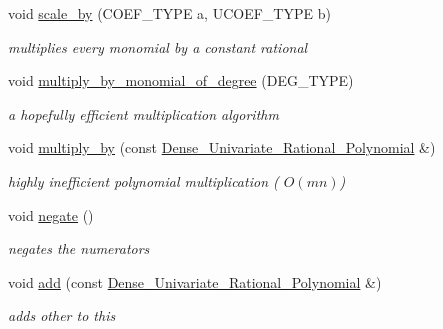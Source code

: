 \begin{Indent}
\begin{DoxyCompactItemize}
void \hyperlink{group__polygroup_a75113519785d8fba7d957b630bd26a54}{scale\+\_\+by} (C\+O\+E\+F\+\_\+\+T\+Y\+PE a, U\+C\+O\+E\+F\+\_\+\+T\+Y\+PE b)
\begin{DoxyCompactList}\small\item\em multiplies every monomial by a constant rational \end{DoxyCompactList}\item 
void \hyperlink{group__polygroup_ab21b7f1a23165a93293db98129fdd48c}{multiply\+\_\+by\+\_\+monomial\+\_\+of\+\_\+degree} (D\+E\+G\+\_\+\+T\+Y\+PE)
\begin{DoxyCompactList}\small\item\em a hopefully efficient multiplication algorithm \end{DoxyCompactList}\item 
\mbox{\label{group__polygroup_af73d51542118ec7fbe36757b2590220e}} 
void \hyperlink{group__polygroup_af73d51542118ec7fbe36757b2590220e}{multiply\+\_\+by} (const \hyperlink{group__polygroup_class_dense___univariate___rational___polynomial}{Dense\+\_\+\+Univariate\+\_\+\+Rational\+\_\+\+Polynomial} \&)
\begin{DoxyCompactList}\small\item\em highly inefficient polynomial multiplication ( $O(mn)$) \end{DoxyCompactList}\item 
\mbox{\label{group__polygroup_a4086e22f45503e348985f120b3c0a79c}} 
void \hyperlink{group__polygroup_a4086e22f45503e348985f120b3c0a79c}{negate} ()
\begin{DoxyCompactList}\small\item\em negates the numerators \end{DoxyCompactList}\item 
\mbox{\label{group__polygroup_a8cf0a014475645d777b7f3168d632a93}} 
void \hyperlink{group__polygroup_a8cf0a014475645d777b7f3168d632a93}{add} (const \hyperlink{group__polygroup_class_dense___univariate___rational___polynomial}{Dense\+\_\+\+Univariate\+\_\+\+Rational\+\_\+\+Polynomial} \&)
\begin{DoxyCompactList}\small\item\em adds {\ttfamily other} to {\ttfamily this} \end{DoxyCompactList}\item 
\mbox{\label{group__polygroup_a61d2068402442a595dde1fcc4dc40f52}} 

\end{DoxyCompactItemize}
\end{Indent}
